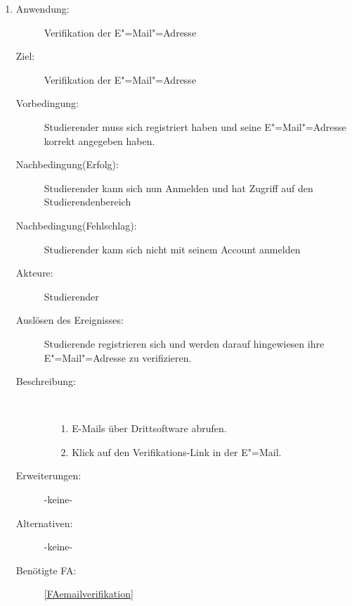 \documentclass[parskip=full]{scrartcl}
\newcommand{\swtLabel}[1]{\textbf{/#1\arabic*0/}}
\begin{document}
\begin{enumerate}[label=\swtLabel{S}]
  \item \label{UCstudVerifikationEmail}
    \begin{description}
    \item[Anwendung:] Verifikation der E"=Mail"=Adresse
    \item[Ziel:] Verifikation der E"=Mail"=Adresse
    \item[Vorbedingung:] Studierender muss sich registriert haben und seine
    E"=Mail"=Adresse korrekt angegeben haben.
    \item[Nachbedingung(Erfolg):] Studierender kann sich nun Anmelden und hat
    Zugriff auf den Studierendenbereich
    \item[Nachbedingung(Fehlschlag):] Studierender kann sich nicht mit seinem Account anmelden
    \item[Akteure:] Studierender
    \item[Auslösen des Ereignisses:] Studierende registrieren sich und werden
    darauf hingewiesen ihre E"=Mail"=Adresse zu verifizieren.
    \item[Beschreibung:]~
    \begin{enumerate}
      \item[1.] E-Mails über Drittsoftware abrufen.
      \item[2.] Klick auf den Verifikations-Link in der E"=Mail.      
    \end{enumerate}
    \item[Erweiterungen:] -keine-
    \item[Alternativen:] -keine-
    \item[Benötigte FA:] \ref{FAemailverifikation}
      \end{description}
  

\end{enumerate}
\end{document}
